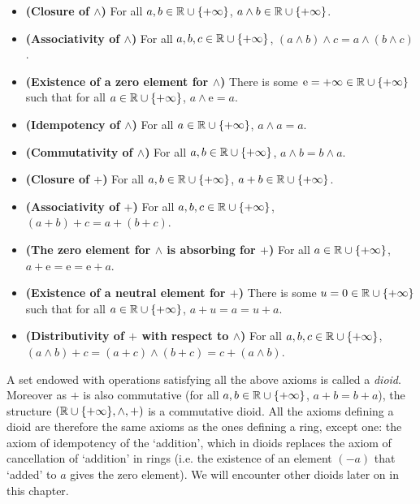 \begin{itemize}
\item{ \textbf{(Closure of $\wedge$)} For all $a, b  \in \mathbb{R} \cup \{ +\infty \}$,
$a \wedge b \in \mathbb{R} \cup \{ +\infty \}$.}
\item{ \textbf{(Associativity of $\wedge$)} For all $a, b, c \in \mathbb{R} \cup \{ +\infty \}$,
$(a \wedge b) \wedge c =  a \wedge (b \wedge c)$.}
\item{ \textbf{(Existence of a zero element for $\wedge$)}
There is some $\mbox{e} = +\infty \in \mathbb{R} \cup \{ +\infty \}$
such that for all $a \in \mathbb{R} \cup \{ +\infty \}$, $a \wedge
\mbox{e} = a$.}
\item{ \textbf{(Idempotency of $\wedge$)}  For all $a  \in \mathbb{R} \cup \{ +\infty \}$,
$a \wedge a = a$.}
\item{ \textbf{(Commutativity of $\wedge$)} For all $a, b \in \mathbb{R} \cup \{ +\infty \}$,
$a \wedge b = b \wedge a$.}
\item{ \textbf{(Closure of $+$)} For all $a, b  \in \mathbb{R} \cup \{ +\infty \}$,
$a + b \in \mathbb{R} \cup \{ +\infty \}$.}
\item{ \textbf{(Associativity of $+$)} For all $a, b, c \in \mathbb{R} \cup \{ +\infty \}$,
$(a + b) + c =  a + (b + c)$.}
\item{ \textbf{(The zero element for $\wedge$ is absorbing for $+$)}
For all $a \in \mathbb{R} \cup \{ +\infty \}$, $a + \mbox{e} =  \mbox{e} =  \mbox{e}+ a$.}
\item{ \textbf{(Existence of a neutral element for $+$)}
There is some $u = 0 \in \mathbb{R} \cup \{ +\infty \}$ such that for
all $a \in \mathbb{R} \cup \{ +\infty \}$, $a + u = a = u + a$.}
\item{ \textbf{(Distributivity of $+$ with respect to $\wedge$)} For all $a, b, c  \in \mathbb{R} \cup \{ +\infty \}$,
$(a \wedge b) + c =  (a + c) \wedge (b + c) = c + (a \wedge b)$. }
\end{itemize}
A set endowed with operations satisfying all the above axioms is called a {\em dioid}.
Moreover as $+$ is also commutative (for all $a, b \in \mathbb{R} \cup \{ +\infty \}$,
$a + b =  b + a$), the structure $(\mathbb{R} \cup  \{ +\infty \}, \wedge, +)$ is a commutative dioid.
All the axioms defining a dioid are therefore the same axioms as
the ones defining a ring, except one: the axiom of idempotency of
the `addition', which in dioids replaces the axiom of cancellation
of `addition' in rings (i.e. the existence of an element $(-a)$
that `added' to $a$ gives the zero element). We will encounter
other dioids later on in this chapter.
